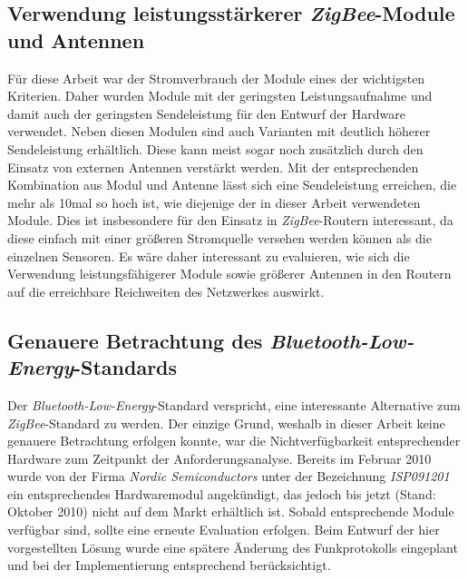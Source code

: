 \subsection{Verwendung leistungsstärkerer \emph{ZigBee}-Module und Antennen}
Für diese Arbeit war der Stromverbrauch der Module eines der wichtigsten Kriterien. Daher wurden Module mit der geringsten
Leistungsaufnahme und damit auch der geringsten Sendeleistung für den Entwurf der Hardware verwendet. Neben diesen
Modulen sind auch Varianten mit deutlich höherer Sendeleistung erhältlich. Diese kann meist sogar noch zusätzlich durch
den Einsatz von externen Antennen verstärkt werden. Mit der entsprechenden Kombination aus Modul und Antenne lässt sich eine
Sendeleistung erreichen, die mehr als 10mal so hoch ist, wie diejenige der in dieser Arbeit verwendeten Module. Dies ist 
insbesondere für den Einsatz in \emph{ZigBee}-Routern interessant, da diese einfach mit einer größeren Stromquelle versehen
werden können als die einzelnen Sensoren. Es wäre daher interessant zu evaluieren, wie sich die Verwendung 
leistungsfähigerer Module sowie größerer Antennen in den Routern auf die erreichbare Reichweiten des Netzwerkes auswirkt.

\subsection{Genauere Betrachtung des \emph{Bluetooth-Low-Energy}-Standards}
Der \emph{Bluetooth-Low-Energy}-Standard verspricht, eine interessante Alternative zum \emph{ZigBee}-Standard zu werden.
Der einzige Grund, weshalb in dieser Arbeit keine genauere Betrachtung erfolgen konnte, war die Nichtverfügbarkeit
entsprechender Hardware zum Zeitpunkt der Anforderungsanalyse. Bereits im Februar 2010 wurde von der Firma 
\emph{Nordic Semiconductors} unter der Bezeichnung \emph{ISP091201} ein entsprechendes Hardwaremodul angekündigt,
das jedoch bis jetzt (Stand: Oktober 2010) nicht auf dem Markt erhältlich ist. Sobald entsprechende Module verfügbar
sind, sollte eine erneute Evaluation erfolgen. Beim Entwurf der hier vorgestellten Lösung wurde eine spätere Änderung
des Funkprotokolls eingeplant und bei der Implementierung entsprechend berücksichtigt.
